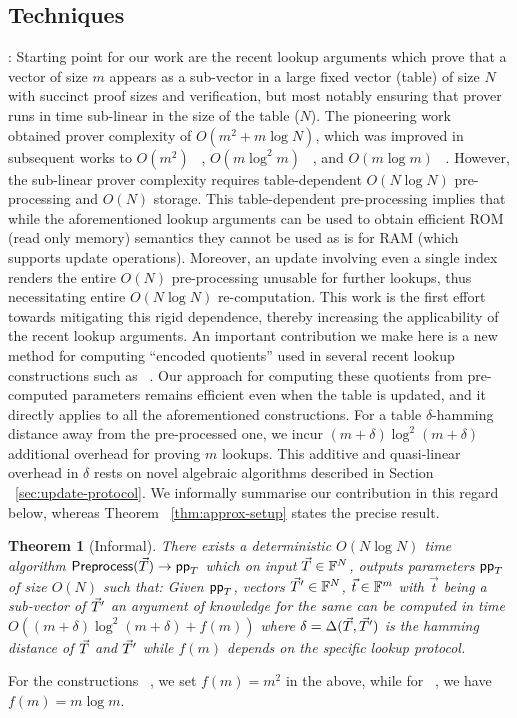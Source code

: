 \documentclass[sigconf]{acmart}
\newtheorem{theorem}{Theorem}[section]
\begin{document}
\subsection{Techniques}\label{subsec:techniques}
: Starting point for our work are the recent lookup arguments which prove
that a vector of size $m$ appears as
a sub-vector in a large fixed vector (table) of size $N$ with succinct proof sizes and verification, but most notably
ensuring that prover runs in time sub-linear in the size of the table ($N$). The pioneering work ~\cite{CCS:ZBKMNS22}
obtained prover complexity of $O(m^2+m\log N)$, which was improved in subsequent works to $O(m^2)$ ~\cite{EPRINT:PosKat22},
$O(m\log^2 m)$ ~\cite{EPRINT:ZGKMR22}, and $O(m\log m)$ ~\cite{EPRINT:EagFioGab22}. However, the sub-linear prover
complexity requires table-dependent $O(N\log N)$ pre-processing and $O(N)$ storage. This table-dependent
pre-processing implies that while
the aforementioned lookup arguments can be used to obtain efficient ROM (read only memory) semantics
they cannot be used as is for RAM (which supports update operations).
Moreover, an update involving even a single
index renders the entire $O(N)$ pre-processing unusable for further lookups,
thus necessitating entire $O(N\log N)$ re-computation. This work is the first effort towards
mitigating this rigid dependence, thereby increasing the applicability of the recent lookup arguments.
An important contribution we make here is a new method for computing ``encoded quotients'' used in several
recent lookup constructions such as ~\cite{CCS:ZBKMNS22,EPRINT:PosKat22,EPRINT:EagFioGab22}.
Our approach for computing these quotients from pre-computed parameters remains efficient even when
the table is updated, and it directly applies to all the aforementioned constructions.
For a table $\delta$-hamming distance away from the pre-processed one, we incur
$(m+\delta)\log^2(m+\delta)$ additional overhead for proving $m$ lookups. This additive and quasi-linear
overhead in $\delta$ rests on novel algebraic algorithms described in Section ~\ref{sec:update-protocol}.
We informally summarise our contribution in this regard below, whereas Theorem ~\ref{thm:approx-setup}
states the precise result.
\begin{theorem}[Informal]\label{thm:pre-process}
	There exists a deterministic $O(N\log N)$ time algorithm $\textsf{Preprocess}(\vec{T})\rightarrow \mathsf{pp}_T$
	which on input $\vec{T}\in \mathbb{F}^N$, outputs parameters $\mathsf{pp}_T$ of size $O(N)$ such
	that: Given $\mathsf{pp}_T$, vectors $\vec{T}'\in \mathbb{F}^N$, $\vec{t}\in \mathbb{F}^m$ with $\vec{t}$ being a sub-vector of $\vec{T}'$
	an argument of knowledge for the same can be computed in time
	$O((m+\delta)\log^2 (m+\delta) + f(m))$ where $\delta=\Delta(\vec{T}, \vec{T}')$
	is the hamming distance of $\vec{T}$ and $\vec{T}'$ while $f(m)$ depends on the specific lookup protocol.
\end{theorem}
For the constructions ~\cite{CCS:ZBKMNS22,EPRINT:PosKat22}, we set $f(m)=m^2$ in the above,
while for ~\cite{EPRINT:EagFioGab22}, we have $f(m)=m\log m$.\smallskip
\end{document}
